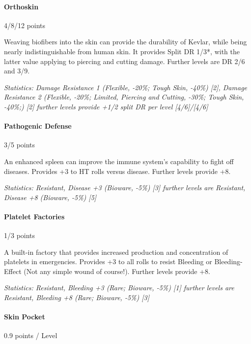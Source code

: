 \begin{multicols*}{3}
	\paragraph{Orthoskin}
	\begin{flushright}
		4/8/12 points
	\end{flushright}
	
	Weaving biofibers into the skin can provide the durability of Kevlar, while being nearly indistinguishable from human skin. It provides Split DR 1/3*, with the latter value applying to piercing and cutting damage. Further levels are DR 2/6 and 3/9.
	
	\textit{\textcolor{OliveGreen}{Statistics: Damage Resistance 1 (Flexible, -20\%; Tough Skin, -40\%) [2], Damage Resistance 2 (Flexible, -20\%; Limited, Piercing and Cutting, -30\%; Tough Skin, -40\%;) [2] further levels provide +1/2 split DR per level [4/6]/[4/6]}}
	
	\paragraph{Pathogenic Defense}
	\begin{flushright}
		3/5 points
	\end{flushright}
	
	An enhanced spleen can improve the immune system's capability to fight off diseases. Provides +3 to HT rolls versus disease.  Further levels provide +8.
	
	\textit{\textcolor{OliveGreen}{Statistics: Resistant, Disease +3 (Bioware, -5\%) [3] further levels are Resistant, Disease +8 (Bioware, -5\%) [5]}}
	
	\paragraph{Platelet Factories}
	\begin{flushright}
		1/3 points
	\end{flushright}

	A built-in factory that provides increased production and concentration of platelets in emergencies. Provides +3 to all rolls to resist Bleeding or Bleeding-Effect (Not any simple wound of course!). Further levels provide +8.
	
	\textit{\textcolor{OliveGreen}{Statistics: Resistant, Bleeding +3 (Rare; Bioware, -5\%) [1] further levels are Resistant, Bleeding +8 (Rare; Bioware, -5\%) [3]}}
	
	\paragraph{Skin Pocket}\label{skin_pocket}
	\begin{flushright}
		0.9 points / Level
	\end{flushright}
	

\end{multicols*}
